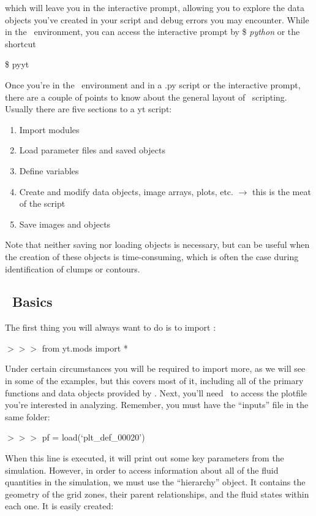which will leave you in the interactive prompt, allowing you to
explore the data objects you've created in your script and debug
errors you may encounter. While in the \yt\ environment, you can access
the interactive prompt by {\$ \it python} or the shortcut

\$ pyyt

Once you're in the \yt\ environment and in a .py script or the
interactive prompt, there are a couple of points to know about the
general layout of \yt\ scripting. Usually there are five sections to a
yt script:
\begin{enumerate}
\item
\indent Import modules
\item
\indent Load parameter files and saved objects
\item
\indent Define variables
\item
\indent Create and modify data objects, image arrays, plots,
etc. $\rightarrow$ this is the meat of the script
\item
\indent Save images and objects
\end{enumerate}

Note that neither saving nor loading objects is necessary, but can be
useful when the creation of these objects is time-consuming, which is
often the case during identification of clumps or contours.

\subsection{\yt\ Basics}

The first thing you will always want to do is to import \yt:

{{\scriptsize$>>>$}} from yt.mods import *

Under certain circumstances you will be required to import more, as we
will see in some of the examples, but this covers most of it,
including all of the primary functions and data objects provided by
\yt. Next, you'll need \yt\ to access the plotfile you're interested in
analyzing. Remember, you must have the ``inputs'' file in the same
folder:

{\scriptsize$>>>$} pf = load(`plt\_def\_00020')

When this line is executed, it will print out some key parameters from
the simulation. However, in order to access information about all of
the fluid quantities in the simulation, we must use the ``hierarchy''
object. It contains the geometry of the grid zones, their parent
relationships, and the fluid states within each one. It is easily
created:

